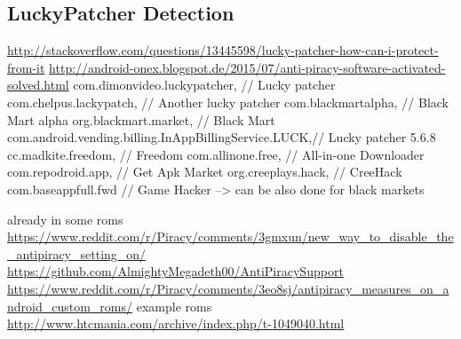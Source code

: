 \subsection{LuckyPatcher Detection}\label{subsection:tampering-luckypatcher}
\url{http://stackoverflow.com/questions/13445598/lucky-patcher-how-can-i-protect-from-it}\newline
\url{http://android-onex.blogspot.de/2015/07/anti-piracy-software-activated-solved.html}\newline
com.dimonvideo.luckypatcher, // Lucky patcher\newline
com.chelpus.lackypatch, // Another lucky patcher\newline
com.blackmartalpha, // Black Mart alpha\newline
org.blackmart.market, // Black Mart\newline
com.android.vending.billing.InAppBillingService.LUCK,// Lucky patcher 5.6.8\newline
cc.madkite.freedom, // Freedom\newline
com.allinone.free, // All-in-one Downloader\newline
com.repodroid.app, // Get Apk Market\newline
org.creeplays.hack, // CreeHack\newline
com.baseappfull.fwd // Game Hacker\newline
--> can be also done for black markets\newline



already in some roms \url{https://www.reddit.com/r/Piracy/comments/3gmxun/new_way_to_disable_the_antipiracy_setting_on/}\newline
\url{https://github.com/AlmightyMegadeth00/AntiPiracySupport}\newline
\url{https://www.reddit.com/r/Piracy/comments/3eo8sj/antipiracy_measures_on_android_custom_roms/}\newline
example roms \url{http://www.htcmania.com/archive/index.php/t-1049040.html}\newline
